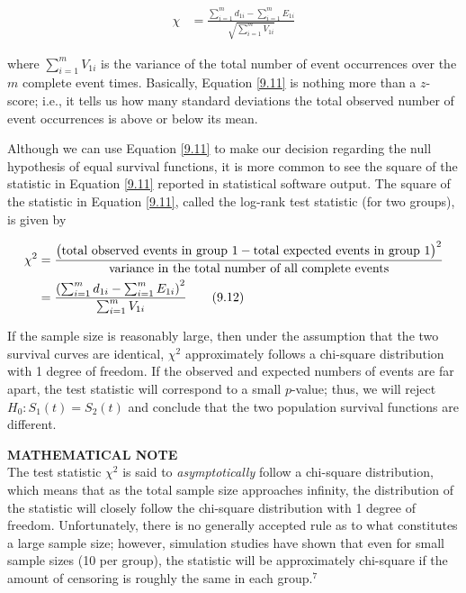 \documentclass[
]{report}
\begin{document}
\begin{align}\label{9.11}
\chi &= \frac{\sum_{i=1}^m d_{1i} - \sum_{i=1}^m E_{1i}}{\sqrt{\sum_{i=1}^m V_{1i}}}
\tag{9.11}
\end{align}

where \(\sum_{i=1}^m V_{1i}\) is the variance of the total number of event occurrences over the \(m\) complete event times. Basically, Equation \ref{9.11} is nothing more than a \(z\)-score; i.e., it tells us how many standard deviations the total observed number of event occurrences is above or below its mean.

Although we can use Equation \ref{9.11} to make our decision regarding the null hypothesis of equal survival functions, it is more common to see the square of the statistic in Equation \ref{9.11} reported in statistical software output. The square of the statistic in Equation \ref{9.11}, called the log-rank test statistic (for two groups), is given by

\begin{align}\label{9.12}
\chi^2 &= \frac{\bigl(\text{total observed events in group 1} - \text{total expected events in group 1}\bigr)^{2}}%
             {\text{variance in the total number of all complete events}} \notag \\
       &= \frac{\left(\sum_{i=1}^m d_{1i} - \sum_{i=1}^m E_{1i}\right)^{2}}{\sum_{i=1}^m V_{1i}}
\tag{9.12}
\end{align}

If the sample size is reasonably large, then under the assumption that the two survival curves are identical, \(\chi^2\) approximately follows a chi-square distribution with 1 degree of freedom. If the observed and expected numbers of events are far apart, the test statistic will correspond to a small \(p\)-value; thus, we will reject \(H_0: S_1(t) = S_2(t)\) and conclude that the two population survival functions are different.

\large

\textbf{MATHEMATICAL NOTE}\\
The test statistic \(\chi^2\) is said to \emph{asymptotically} follow a chi-square distribution, which means that as the total sample size approaches infinity, the distribution of the statistic will closely follow the chi-square distribution with 1 degree of freedom. Unfortunately, there is no generally accepted rule as to what constitutes a large sample size; however, simulation studies have shown that even for small sample sizes (10 per group), the statistic will be approximately chi-square if the amount of censoring is roughly the same in each group.\(^7\)
\normalsize
\end{document}
